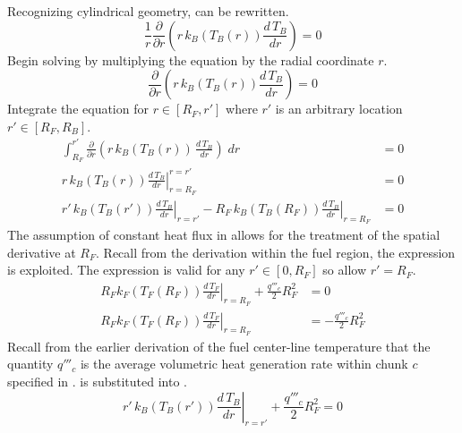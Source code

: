       Recognizing cylindrical geometry,  can be rewritten.
      \begin{equation}
        \label{eq:tb_heat_conduction}
        \frac{1}{r} \frac{\partial}{\partial r} \left(
          r \, k_B(T_B(r)) \frac{d \, T_B}{dr} \right) = 0
      \end{equation}
      Begin solving  by multiplying the equation by
      the radial coordinate $r$.
      \begin{equation}
        \frac{\partial}{\partial r} \left( r \, k_B(T_B(r)) \frac{d \, T_B}{dr}
          \right) = 0
      \end{equation}
      Integrate the equation for $r \in[R_F,r']$ where $r'$ is an arbitrary
      location $r' \in [R_F,R_B]$.
      \begin{align}
        \int_{R_F}^{r'} \frac{\partial}{\partial r} \left( r\, k_B(T_B(r)) \, 
          \frac{d\,T_B}{dr} \right) \; dr &= 0\\
        \left. r\, k_B(T_B(r)) \frac{d\,T_B}{dr} \right|_{r=R_F}^{r=r'} &= 0 \\
        \label{eq:tf_first_integral}
        \left. r' \, k_B(T_B(r')) \frac{d\,T_B}{dr} \right|_{r=r'} - 
          \left. R_F \, k_B(T_B(R_F)) \frac{d\,T_B}{dr} \right|_{r=R_F} &= 0
      \end{align}
      The assumption of constant heat flux in  
      allows for the treatment of the spatial derivative at $R_F$. Recall from
      the derivation within the fuel region, the expression 
      is exploited. The expression is valid for any $r' \in [0,R_F]$ so allow
      $r'=R_F$.
      \begin{align}
        \left. R_F k_F(T_F(R_F)) \frac{d\,T_F}{dr} \right|_{r=R_F} + 
          \frac{q'''_c}{2} R_F^2 &= 0 \\
        \label{eq:surface_relation}
        \left. R_F k_F(T_F(R_F)) \frac{d\,T_F}{dr} \right|_{r=R_F} &= 
          - \frac{q'''_c}{2} R_F^2
      \end{align}
      Recall from the earlier derivation of the fuel center-line temperature 
      that the quantity $q'''_c$ is the average volumetric heat generation rate
      within chunk $c$ specified in .
       is substituted into
      .
      \begin{equation}
        \label{eq:tf_first_bc}
        \left. r' \, k_B(T_B(r')) \frac{d\,T_B}{dr} \right|_{r=r'} +
          \frac{q'''_c}{2} R_F^2 = 0
      \end{equation}
